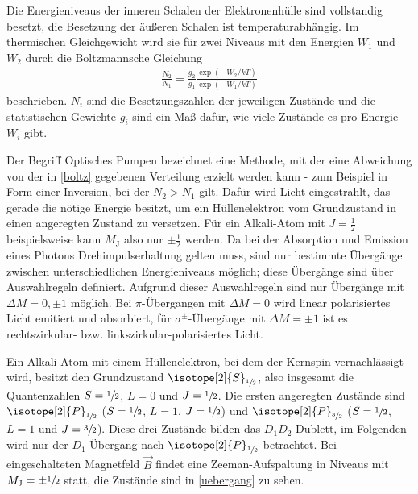 Die Energieniveaus der inneren Schalen der Elektronenhülle sind vollstandig besetzt, die Besetzung der äußeren Schalen ist
temperaturabhängig. Im thermischen Gleichgewicht wird sie für zwei Niveaus mit den Energien $W_1$ und $W_2$ durch die
Boltzmannsche Gleichung
\begin{align}
  \frac{N_2}{N_1} = \frac{g_2}{g_1}\frac{\exp(-W_2/kT)}{\exp(-W_1/kT)}
  \label{boltz}
\end{align}
beschrieben. $N_i$ sind die Besetzungszahlen der jeweiligen Zustände und die statistischen
Gewichte $g_i$ sind ein Maß dafür, wie viele Zustände es pro Energie $W_i$ gibt.

Der Begriff Optisches Pumpen bezeichnet eine Methode, mit der eine Abweichung von der in
\autoref{boltz} gegebenen Verteilung erzielt werden kann - zum Beispiel in Form einer Inversion,
bei der $N_2 > N_1$ gilt. Dafür wird Licht eingestrahlt, das gerade die nötige Energie besitzt,
um ein Hüllenelektron vom Grundzustand in einen angeregten Zustand zu versetzen. Für ein
Alkali-Atom mit $J=\frac{1}{2}$ beispielsweise kann $M_\text{J}$ also nur $\pm \frac{1}{2}$
werden. Da bei der Absorption und Emission eines Photons Drehimpulserhaltung gelten muss, sind
nur bestimmte Übergänge zwischen unterschiedlichen Energieniveaus möglich; diese Übergänge sind
über Auswahlregeln definiert. Aufgrund dieser Auswahlregeln sind nur Übergänge mit
$\Delta M = 0,\pm 1$ möglich.
Bei $\pi$-Übergangen mit $\Delta M = 0$ wird linear polarisiertes Licht emitiert und absorbiert, für $\sigma^\pm$-Übergänge
mit $\Delta M = \pm 1$ ist es rechtszirkular- bzw. linkszirkular-polarisiertes Licht.

Ein Alkali-Atom mit einem Hüllenelektron, bei dem der Kernspin vernachlässigt wird, besitzt
den Grundzustand $\isotope[2]{S}_{\sfrac{1}{2}}$, also insgesamt die Quantenzahlen
$S=\sfrac{1}{2}$, $L=0$ und $J=\sfrac{1}{2}$. Die ersten angeregten Zustände sind
$\isotope[2]{P}_{\sfrac{1}{2}}$ ($S=\sfrac{1}{2}$, $L=1$, $J=\sfrac{1}{2}$) und
$\isotope[2]{P}_{\sfrac{3}{2}}$ ($S=\sfrac{1}{2}$, $L=1$ und $J=\sfrac{3}{2}$). Diese drei
Zustände bilden das $D_1D_2$-Dublett, im Folgenden wird nur der $D_1$-Übergang nach
$\isotope[2]{P}_{\sfrac{1}{2}}$ betrachtet.
Bei eingeschalteten Magnetfeld $\vec{B}$ findet eine Zeeman-Aufspaltung in Niveaus mit
$M_\text{J}=\pm\sfrac{1}{2}$ statt, die Zustände sind in \autoref{uebergang} zu sehen.

